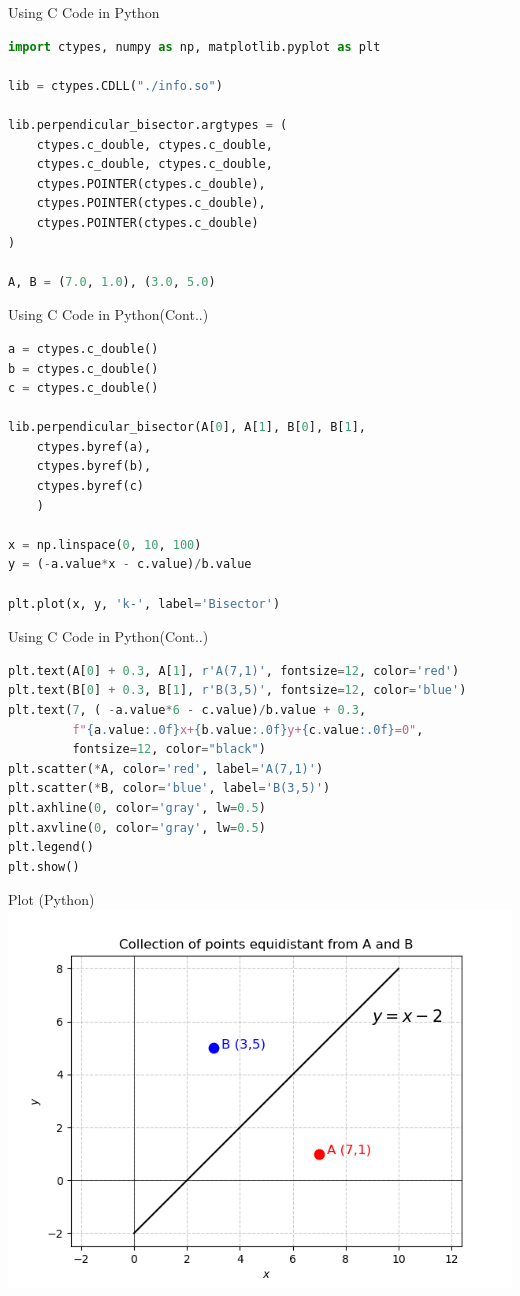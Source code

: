 \documentclass{beamer}
\begin{document}
\begin{frame}[fragile]{Using C Code in Python}
\begin{lstlisting}[language=Python]
import ctypes, numpy as np, matplotlib.pyplot as plt

lib = ctypes.CDLL("./info.so")

lib.perpendicular_bisector.argtypes = (
    ctypes.c_double, ctypes.c_double,
    ctypes.c_double, ctypes.c_double,
    ctypes.POINTER(ctypes.c_double),
    ctypes.POINTER(ctypes.c_double),
    ctypes.POINTER(ctypes.c_double)
)

A, B = (7.0, 1.0), (3.0, 5.0)


\end{lstlisting}
\end{frame}
\begin{frame}[fragile]{Using C Code in Python(Cont..)}
\begin{lstlisting}[language=Python]
a = ctypes.c_double()
b = ctypes.c_double()
c = ctypes.c_double()

lib.perpendicular_bisector(A[0], A[1], B[0], B[1],
    ctypes.byref(a), 
    ctypes.byref(b), 
    ctypes.byref(c)
    )

x = np.linspace(0, 10, 100)
y = (-a.value*x - c.value)/b.value

plt.plot(x, y, 'k-', label='Bisector')

\end{lstlisting}
\end{frame}
\begin{frame}[fragile]{Using C Code in Python(Cont..)}
\begin{lstlisting}[language=Python]
plt.text(A[0] + 0.3, A[1], r'A(7,1)', fontsize=12, color='red')
plt.text(B[0] + 0.3, B[1], r'B(3,5)', fontsize=12, color='blue')
plt.text(7, ( -a.value*6 - c.value)/b.value + 0.3,
         f"{a.value:.0f}x+{b.value:.0f}y+{c.value:.0f}=0",
         fontsize=12, color="black")
plt.scatter(*A, color='red', label='A(7,1)')
plt.scatter(*B, color='blue', label='B(3,5)')
plt.axhline(0, color='gray', lw=0.5)
plt.axvline(0, color='gray', lw=0.5)
plt.legend()
plt.show()

\end{lstlisting}
\end{frame}

\begin{frame}{Plot (Python)}
\centering
\includegraphics[width=0.8\linewidth]{figs/plt.png}
\end{frame}
\end{document}
